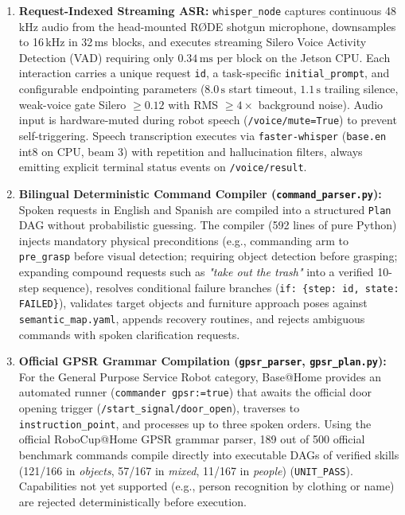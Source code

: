 \documentclass[runningheads,a4paper]{llncs}
\begin{document}
\begin{enumerate}
    \item \textbf{Request-Indexed Streaming ASR:} \texttt{whisper\_node} captures continuous 48\,kHz audio from the head-mounted R\O{}DE shotgun microphone, downsamples to 16\,kHz in 32\,ms blocks, and executes streaming Silero Voice Activity Detection (VAD) requiring only $0.34\,\text{ms}$ per block on the Jetson CPU. Each interaction carries a unique request \texttt{id}, a task-specific \texttt{initial\_prompt}, and configurable endpointing parameters ($8.0\,\text{s}$ start timeout, $1.1\,\text{s}$ trailing silence, weak-voice gate Silero $\ge 0.12$ with RMS $\ge 4\times$ background noise). Audio input is hardware-muted during robot speech (\texttt{/voice/mute=True}) to prevent self-triggering. Speech transcription executes via \texttt{faster-whisper} (\texttt{base.en} int8 on CPU, beam 3) with repetition and hallucination filters, always emitting explicit terminal status events on \texttt{/voice/result}.

    \item \textbf{Bilingual Deterministic Command Compiler (\texttt{command\_parser.py}):} Spoken requests in English and Spanish are compiled into a structured \texttt{Plan} DAG without probabilistic guessing. The compiler (592 lines of pure Python) injects mandatory physical preconditions (e.g., commanding arm to \texttt{pre\_grasp} before visual detection; requiring object detection before grasping; expanding compound requests such as \textit{"take out the trash"} into a verified 10-step sequence), resolves conditional failure branches (\texttt{if: \{step: id, state: FAILED\}}), validates target objects and furniture approach poses against \texttt{semantic\_map.yaml}, appends recovery routines, and rejects ambiguous commands with spoken clarification requests.

    \item \textbf{Official GPSR Grammar Compilation (\texttt{gpsr\_parser}, \texttt{gpsr\_plan.py}):} For the General Purpose Service Robot category, Base@Home provides an automated runner (\texttt{commander gpsr:=true}) that awaits the official door opening trigger (\texttt{/start\_signal/door\_open}), traverses to \texttt{instruction\_point}, and processes up to three spoken orders. Using the official RoboCup@Home GPSR grammar parser, 189 out of 500 official benchmark commands compile directly into executable DAGs of verified skills (121/166 in \textit{objects}, 57/167 in \textit{mixed}, 11/167 in \textit{people}) (\texttt{UNIT\_PASS}). Capabilities not yet supported (e.g., person recognition by clothing or name) are rejected deterministically before execution.


\end{enumerate}
\end{document}
